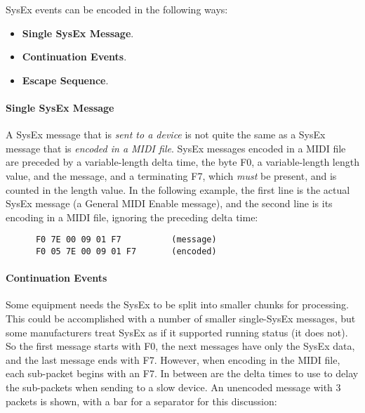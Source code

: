    SysEx events can be encoded in the following ways:

   \begin{itemize}
      \item \textbf{Single SysEx Message}.
      \item \textbf{Continuation Events}.
      \item \textbf{Escape Sequence}.
   \end{itemize}

\paragraph{Single SysEx Message}
\label{paragraph:patterns_single_sysex_message}

   A SysEx message that is \textsl{sent to a device} is not quite the 
   same as a SysEx message that is \textsl{encoded in a MIDI file}.
   SysEx messages encoded in a MIDI file
   are preceded by a variable-length delta time, the byte F0,
   a variable-length length value, and the message, and a terminating F7,
   which \textsl{must} be present, and is counted in the length value.
   In the following example, the first line is the actual SysEx message
   (a General MIDI Enable message),
   and the second line is its encoding in a MIDI file, ignoring the preceding
   delta time:

   \begin{verbatim}
      F0 7E 00 09 01 F7          (message)
      F0 05 7E 00 09 01 F7       (encoded)
   \end{verbatim}

\paragraph{Continuation Events}
\label{paragraph:patterns_continuation_events}

   Some equipment needs the SysEx to be split into smaller chunks for
   processing.
   This could be accomplished with a number of smaller single-SysEx messages,
   but some manufacturers treat SysEx as if it supported running status (it
   does not).
   So the first message starts with F0, the next messages have only the SysEx
   data, and the last message ends with F7.
   However, when encoding in the MIDI file, each sub-packet begins with
   an F7.
   In between are the delta times to use to delay the sub-packets when sending
   to a slow device.
   An unencoded message with 3 packets is shown,
   with a bar for a separator for this discussion:

